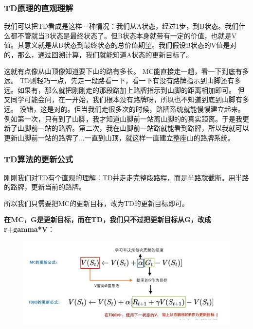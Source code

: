 \documentclass[12pt]{article}
\begin{document}
\subsubsection{TD原理的直观理解}
我们可以把TD看成是这样一种情况：我们从A状态，经过1步，到B状态。我们什么都不管就当B状态是最终状态了。但B状态本身就带有一定的价值，也就是V值。其意义就是从B状态到最终状态的总价值期望。我们假设B状态的V值是对的，那么，通过回溯计算，我们就能知道A状态的更新目标了。

这就有点像从山顶像知道要下山的路有多长。 MC能直接走一趟，看一下到底有多远。 TD则轻巧一点，先走一段路看一下，看一下有没有路牌指示到山脚还有多远。如果有，那么就把刚刚走的那段路加上路牌指示到山脚的距离相加即可。 但又同学可能会问，在一开始，我们根本没有路牌呀，所以也不知道到底到山脚有多远。 没错，这是对的。但当我们走很多次的时候，路牌系统就能慢慢建立起来。 例如第一次，只有到了山脚，我才知道山脚前一站离山脚的的真实距离。于是我更新了山脚前一站的路牌。第二次，我在山脚前一站路就能看到路牌，所以我就可以更新山脚前一站的路牌了...一直到山顶，就这样一直建立整座山的路牌系统。

\subsubsection{TD算法的更新公式}
刚刚我们对TD有个直观的理解：TD并走走完整段路程，而是半路就截断。用半路的路牌，更新当前的路牌。

所以我们只需要把MC的更新目标，改为TD的更新目标即可。

\textbf{在MC，G是更新目标，而在TD，我们只不过把更新目标从G，改成r+gamma*V}：
\begin{figure}[H]
    \centering
    \includegraphics[width=1\textwidth]{fig/ReinforcementLearning/RL_Compute_V_By_TD_MC_Compare.png}
\end{figure}
\end{document}

